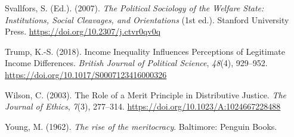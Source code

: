 \documentclass[
  12pt,
]{article}
\newlength{\cslhangindent}
\newenvironment{CSLReferences}[2] %
 {\begin{list}{}{%
  \setlength{\itemindent}{0pt}
  \setlength{\leftmargin}{0pt}
  \setlength{\parsep}{0pt}
  \ifodd #1
   \setlength{\leftmargin}{\cslhangindent}
   \setlength{\itemindent}{-1\cslhangindent}
  \fi
  \setlength{\itemsep}{#2\baselineskip}}}
 {\end{list}}
\begin{document}
\begin{CSLReferences}{1}{0}
Svallfors, S. (Ed.). (2007). \emph{The {Political Sociology} of the
{Welfare State}: {Institutions}, {Social Cleavages}, and {Orientations}}
(1st ed.). Stanford University Press.
\url{https://doi.org/10.2307/j.ctvr0qv0q}

Trump, K.-S. (2018). Income {Inequality Influences Perceptions} of
{Legitimate Income Differences}. \emph{British Journal of Political
Science}, \emph{48}(4), 929--952.
\url{https://doi.org/10.1017/S0007123416000326}

Wilson, C. (2003). The {Role} of a {Merit Principle} in {Distributive
Justice}. \emph{The Journal of Ethics}, \emph{7}(3), 277--314.
\url{https://doi.org/10.1023/A:1024667228488}

Young, M. (1962). \emph{The rise of the meritocracy}. Baltimore: Penguin
Books.

\end{CSLReferences}
\end{document}
